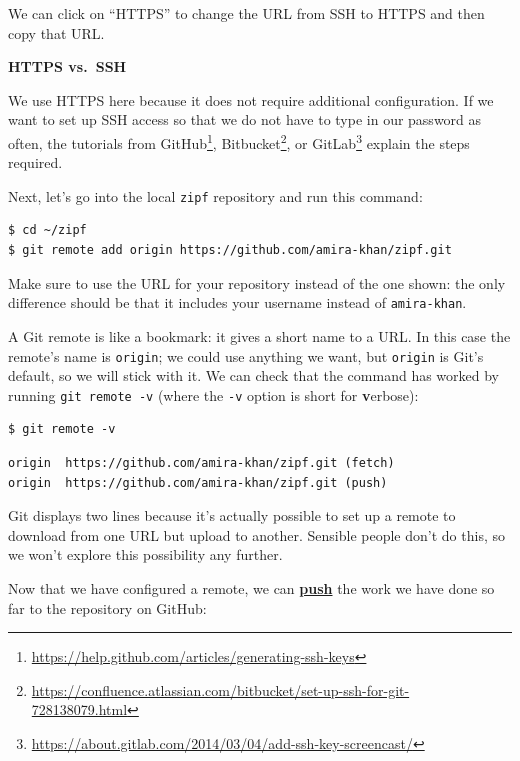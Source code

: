 \documentclass[
]{krantz}
\renewenvironment{quote}{\begin{VF}}{\end{VF}}
\renewcommand{\href}[2]{#2\footnote{\url{#1}}}
\newcommand{\gref}[2]{\hyperlink{#2}{\textbf{#1}}}
\begin{document}
We can click on ``HTTPS'' to change the URL from SSH to HTTPS
and then copy that URL.

\begin{quote}
\textbf{HTTPS vs.~SSH}

We use HTTPS here because it does not require additional configuration.
If we want to set up SSH access so that we do not have to type in our password as often,
the tutorials from \href{https://help.github.com/articles/generating-ssh-keys}{GitHub},
\href{https://confluence.atlassian.com/bitbucket/set-up-ssh-for-git-728138079.html}{Bitbucket},
or \href{https://about.gitlab.com/2014/03/04/add-ssh-key-screencast/}{GitLab}
explain the steps required.
\end{quote}

Next,
let's go into the local \texttt{zipf} repository and run this command:

\begin{verbatim}
$ cd ~/zipf
$ git remote add origin https://github.com/amira-khan/zipf.git
\end{verbatim}

Make sure to use the URL for your repository instead of the one shown:
the only difference should be that it includes your username instead of \texttt{amira-khan}.

A Git remote is like a bookmark:
it gives a short name to a URL.
In this case the remote's name is \texttt{origin};
we could use anything we want,
but \texttt{origin} is Git's default,
so we will stick with it.
We can check that the command has worked by running \texttt{git\ remote\ -v}
(where the \texttt{-v} option is short for \textbf{v}erbose):

\begin{verbatim}
$ git remote -v
\end{verbatim}

\begin{verbatim}
origin  https://github.com/amira-khan/zipf.git (fetch)
origin  https://github.com/amira-khan/zipf.git (push)
\end{verbatim}

Git displays two lines because it's actually possible to set up a remote
to download from one URL but upload to another.
Sensible people don't do this,
so we won't explore this possibility any further.

Now that we have configured a remote,
we can \gref{push}{git\_push} the work we have done so far
to the repository on GitHub:
\end{document}
